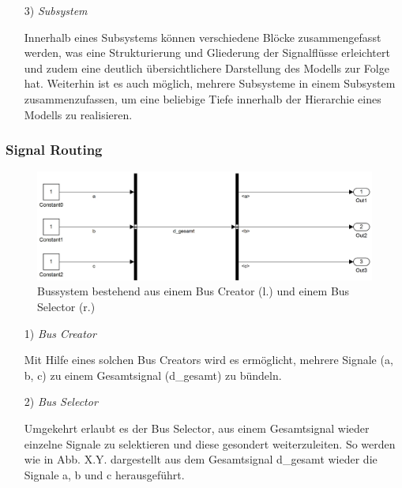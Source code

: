 \documentclass[fontsize = 12pt, paper = a4]{scrreprt}
\begin{document}
\begin{itemize}
\item[3)] \textit{Subsystem}

Innerhalb eines Subsystems können verschiedene Blöcke zusammengefasst werden, was eine Strukturierung und Gliederung der Signalflüsse erleichtert und zudem eine deutlich übersichtlichere Darstellung des Modells zur Folge hat. Weiterhin ist es auch möglich, mehrere Subsysteme in einem Subsystem zusammenzufassen, um eine beliebige Tiefe innerhalb der Hierarchie eines Modells zu realisieren. \\

\end{itemize}

\subsubsection{Signal Routing}

\begin{figure}[h]
\centering
\includegraphics[scale = 0.45]{bus_gesamt}
\caption[Bussystem]
{Bussystem bestehend aus einem Bus Creator (l.) und einem Bus Selector (r.)}
\end{figure}

\newpage

\begin{itemize}

\item[1)] \textit{Bus Creator}

Mit Hilfe eines solchen Bus Creators wird es ermöglicht, mehrere Signale (a, b, c) zu einem Gesamtsignal (d\_gesamt) zu bündeln.

\item[2)] \textit{Bus Selector}

Umgekehrt erlaubt es der Bus Selector, aus einem Gesamtsignal wieder einzelne Signale zu selektieren und diese gesondert weiterzuleiten. So werden wie in Abb. X.Y. dargestellt aus dem Gesamtsignal d\_gesamt wieder die Signale a, b und c herausgeführt. \\

\end{itemize}
\end{document}
